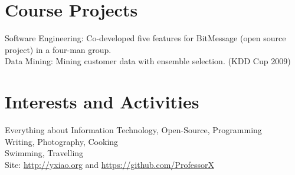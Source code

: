 \documentclass[a4paper,10pt]{article} %
\begin{document}
\section{Course Projects}
\label{sec:course-projects}
Software Engineering: Co-developed five features for BitMessage (open
source project) in a four-man group.\\
Data Mining: Mining customer data with ensemble selection. (KDD Cup 2009)




\section{Interests and Activities}

Everything about Information Technology, Open-Source, Programming\\
Writing, Photography, Cooking\\
Swimming, Travelling\\
Site: \url{http://yxiao.org} and \url{https://github.com/ProfessorX}





\end{document}
